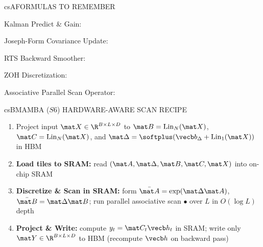 \documentclass[../../../../master.tex]{subfiles}
\begin{document}

\csnextpage

\begin{cscolumns}
\begin{cscard}{csA}{FORMULAS TO REMEMBER}
  \begin{csbul}
    \item Kalman Predict \& Gain:
    \item Joseph-Form Covariance Update:
    \item RTS Backward Smoother:
    \item ZOH Discretization:
    \item Associative Parallel Scan Operator:
  \end{csbul}
\end{cscard}

\begin{cscard}{csB}{MAMBA ($S6$) HARDWARE-AWARE SCAN RECIPE}
  \begin{enumerate}[leftmargin=1.2em, itemsep=1pt, topsep=1pt, parsep=0pt]
    \item Project input $\mat X\in\R^{B\times L\times D}$ to $\mat B=\mathrm{Lin}_N(\mat X)$, $\mat C=\mathrm{Lin}_N(\mat X)$, and $\mat\Delta=\softplus(\vecb b_\Delta + \mathrm{Lin}_1(\mat X))$ in HBM
    \item \textbf{Load tiles to SRAM:} read $(\mat A, \mat\Delta, \mat B, \mat C, \mat X)$ into on-chip SRAM
    \item \textbf{Discretize \& Scan in SRAM:} form $\bar{\mat A}=\exp(\mat\Delta\mat A)$, $\bar{\mat B}=\mat\Delta\mat B$; run parallel associative scan $\bullet$ over $L$ in $O(\log L)$ depth
    \item \textbf{Project \& Write:} compute $y_t = \mat C_t\vecb h_t$ in SRAM; write only $\mat Y\in\R^{B\times L\times D}$ to HBM (recompute $\vecb h$ on backward pass)
  \end{enumerate}
\end{cscard}
\columnbreak


\end{cscolumns}
\end{document}

